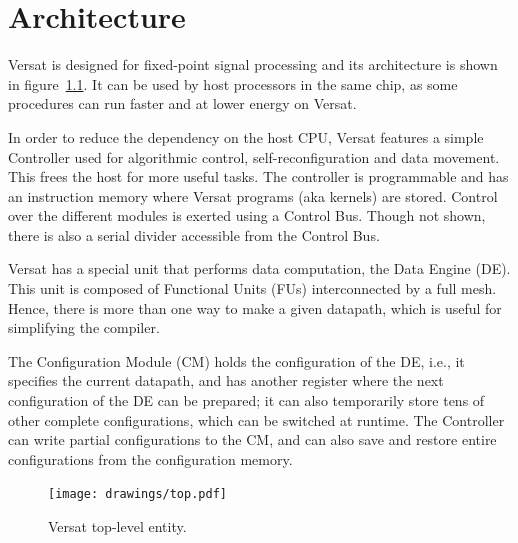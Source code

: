 
\chapter{Architecture}
\label{chapter:architecture}

Versat is designed for fixed-point signal processing and its
architecture is shown in figure~\ref{fig_top}. It can be used by host
processors in the same chip, as some procedures can run faster and at
lower energy on Versat.

In order to reduce the dependency on the host CPU, Versat features a
simple Controller used for algorithmic control, self-reconfiguration
and data movement. This frees the host for more useful tasks. The
controller is programmable and has an instruction memory where Versat
programs (aka kernels) are stored. Control over the different modules
is exerted using a Control Bus. Though not shown, there is also a
serial divider accessible from the Control Bus.

Versat has a special unit that performs data computation, the Data
Engine (DE). This unit is composed of Functional Units (FUs)
interconnected by a full mesh. Hence, there is more than one way to
make a given datapath, which is useful for simplifying the compiler.

The Configuration Module (CM) holds the configuration of the DE, i.e.,
it specifies the current datapath, and has another register where the
next configuration of the DE can be prepared; it can also temporarily
store tens of other complete configurations, which can be switched at
runtime. The Controller can write partial configurations to the CM,
and can also save and restore entire configurations from the
configuration memory.

\begin{figure}[!htb]
\centering \texttt{[image: drawings/top.pdf]}
\caption{Versat top-level entity.}
\label{fig_top}
\end{figure}


